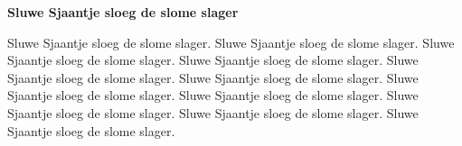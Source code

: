 \documentclass[11pt,a4paper]{article}
\begin{document}
\textbf{Sluwe Sjaantje sloeg de slome slager}

Sluwe Sjaantje sloeg de slome slager. Sluwe Sjaantje sloeg de slome slager. Sluwe Sjaantje sloeg de slome slager. Sluwe Sjaantje sloeg de slome slager. Sluwe Sjaantje sloeg de slome slager. Sluwe Sjaantje sloeg de slome slager. Sluwe Sjaantje sloeg de slome slager. Sluwe Sjaantje sloeg de slome slager. Sluwe Sjaantje sloeg de slome slager. Sluwe Sjaantje sloeg de slome slager. Sluwe Sjaantje sloeg de slome slager.
\end{document}
